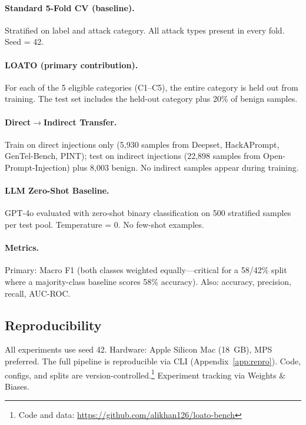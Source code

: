 \documentclass[conference]{IEEEtran}
\newcommand{\Fone}{F1}
\begin{document}
\paragraph{Standard 5-Fold CV (baseline).}
Stratified on label and attack category. All attack types present in every fold.
Seed = 42.

\paragraph{LOATO (primary contribution).}
For each of the 5 eligible categories (C1--C5), the entire category is held out
from training. The test set includes the held-out category plus 20\% of benign
samples.

\paragraph{Direct$\to$Indirect Transfer.}
Train on direct injections only (5,930 samples from Deepset, HackAPrompt,
GenTel-Bench, PINT); test on indirect injections (22,898 samples from
Open-Prompt-Injection) plus 8,003 benign. No indirect samples appear during
training.

\paragraph{LLM Zero-Shot Baseline.}
GPT-4o evaluated with zero-shot binary classification on 500 stratified samples
per test pool. Temperature = 0. No few-shot examples.

\paragraph{Metrics.}
Primary: Macro \Fone{} (both classes weighted equally---critical for a 58/42\%
split where a majority-class baseline scores 58\% accuracy). Also: accuracy,
precision, recall, AUC-ROC.

\subsection{Reproducibility}
\label{sec:repro}

All experiments use seed 42. Hardware: Apple Silicon Mac (18~GB), MPS preferred.
The full pipeline is reproducible via CLI (Appendix~\ref{app:repro}). Code,
configs, and splits are version-controlled.\footnote{Code and data:
\url{https://github.com/alikhan126/loato-bench}}
Experiment tracking via Weights \& Biases.
\end{document}
